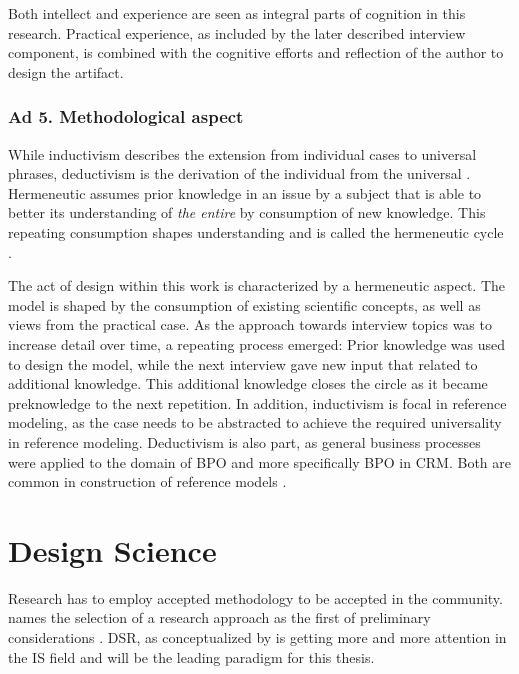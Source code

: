 Both intellect and experience are seen as integral parts of cognition in this research. Practical experience, as included by the later described interview component, is combined with the cognitive efforts and reflection of the author to design the artifact. 

\subsubsection{Ad 5. Methodological aspect}
While inductivism describes the extension from individual cases to universal phrases, deductivism is the derivation of the individual from the universal \cite{seiffert2006einführung}. Hermeneutic assumes prior knowledge in an issue by a subject that is able to better its understanding of \textit{the entire} by consumption of new knowledge. This repeating consumption shapes understanding and is called the hermeneutic cycle \citep{Butler1998}.

The act of design within this work is characterized by a hermeneutic aspect. The model is shaped by the consumption of existing scientific concepts, as well as views from the practical case. As the approach towards interview topics was to increase detail over time, a repeating process emerged: Prior knowledge was used to design the model, while the next interview gave new input that related to additional knowledge. This additional knowledge closes the circle as it became preknowledge to the next repetition. In addition, inductivism is focal in reference modeling, as the case needs to be abstracted to achieve the required universality in reference modeling. Deductivism is also part, as general business processes were applied to the domain of BPO and more specifically BPO in CRM.  Both are common in construction of reference models \citep{thomas2006mang,Fettke2014meth}.


\section{Design Science}
Research has to employ accepted methodology to be accepted in the community. \citeauthor{creswell2013research} names the selection of a research approach as the first of preliminary considerations \citep{creswell2013research}. \acrfull{DSR}, as conceptualized by \cite{simon1996sciences} is getting more and more attention in the \acrshort{IS} field and will be the leading paradigm for this thesis. 

